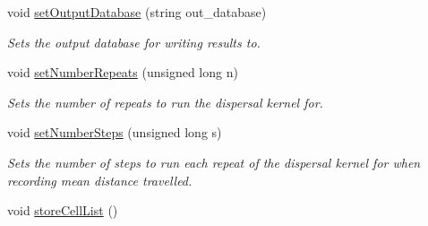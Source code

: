 \begin{DoxyCompactItemize}
\item 
void \hyperlink{class_simulate_dispersal_acae5067045d5989df6d7dce80bcfe276}{set\+Output\+Database} (string out\+\_\+database)
\begin{DoxyCompactList}\small\item\em Sets the output database for writing results to. \end{DoxyCompactList}\item 
void \hyperlink{class_simulate_dispersal_a29c7cf41d8b5610109d61f302fb32e73}{set\+Number\+Repeats} (unsigned long n)
\begin{DoxyCompactList}\small\item\em Sets the number of repeats to run the dispersal kernel for. \end{DoxyCompactList}\item 
void \hyperlink{class_simulate_dispersal_a4a38f61284426daa4d968bbab91d3608}{set\+Number\+Steps} (unsigned long s)
\begin{DoxyCompactList}\small\item\em Sets the number of steps to run each repeat of the dispersal kernel for when recording mean distance travelled. \end{DoxyCompactList}\item 
void \hyperlink{class_simulate_dispersal_a85d8ee68e5f4962429571c835aa028b4}{store\+Cell\+List} ()\hypertarget{class_simulate_dispersal_a85d8ee68e5f4962429571c835aa028b4}{}\label{class_simulate_dispersal_a85d8ee68e5f4962429571c835aa028b4}


\end{DoxyCompactItemize}
